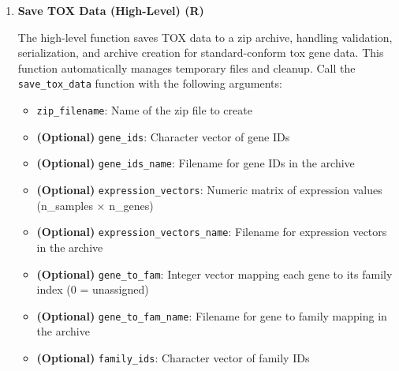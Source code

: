 \begin{enumerate}
\textbf{Returns:}
\begin{itemize}
    \item List mapping data keys to extracted temporary filenames
\end{itemize}

\begin{lstlisting}[language=R, caption={R Extract Zip Archive}]
extract_zip_archive(zip_filename)
\end{lstlisting}

\item \textbf{Save TOX Data (High-Level) (R)}

The high-level function saves TOX data to a zip archive, handling
validation, serialization, and archive creation for standard-conform tox
gene data. This function automatically manages temporary files and cleanup.
Call the \texttt{save\_tox\_data} function with the following arguments:

\begin{itemize}
    \item \texttt{zip\_filename}: Name of the zip file to create
          
    \item \textbf{(Optional)} \texttt{gene\_ids}: Character vector of gene
          IDs
          
    \item \textbf{(Optional)} \texttt{gene\_ids\_name}: Filename for gene
          IDs in the archive
          
    \item \textbf{(Optional)} \texttt{expression\_vectors}: Numeric matrix
          of expression values (n\_samples × n\_genes)
          
    \item \textbf{(Optional)} \texttt{expression\_vectors\_name}: Filename
          for expression vectors in the archive
          
    \item \textbf{(Optional)} \texttt{gene\_to\_fam}: Integer vector mapping
          each gene to its family index (0 = unassigned)
          
    \item \textbf{(Optional)} \texttt{gene\_to\_fam\_name}: Filename for
          gene to family mapping in the archive
          
    \item \textbf{(Optional)} \texttt{family\_ids}: Character vector of
          family IDs
          

\end{itemize}
\end{enumerate}
